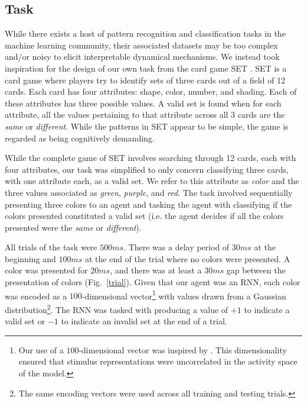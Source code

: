 \documentclass[conference]{IEEEtran}
\begin{document}
\subsection{Task}
\label{taskmethod}

While there exists a host of pattern recognition and classification tasks in the machine learning community\cite{bishop2006pattern,lecun2015deep}, their associated datasets may be too complex and/or noisy to elicit interpretable dynamical mechanisms. We instead took inspiration for the design of our own task from the card game SET \cite{gordon2017joy}. SET is a card game where players try to identify sets of three cards out of a field of 12 cards. Each card has four attributes: shape, color, number, and shading. Each of these attributes has three possible values. A valid set is found when for each attribute, all the values pertaining to that attribute across all 3 cards are the \textit{same} or \textit{different}. While the patterns in SET appear to be simple, the game is regarded as being cognitively demanding\cite{gordon2017joy}.

While the complete game of SET involves searching through 12 cards, each with four attributes, our task was simplified to only concern classifying three cards, with one attribute each, as a valid set. We refer to this attribute as \textit{color} and the three values associated as \textit{green}, \textit{purple}, and \textit{red}. The task involved sequentially presenting three colors to an agent and tasking the agent with classifying if the colors presented constituted a valid set (i.e. the agent decides if all the colors presented were the \textit{same} or \textit{different}).

All trials of the task were $500 ms$. There was a delay period of $30 ms$ at the beginning and $100 ms$ at the end of the trial where no colors were presented. A color was presented for $20 ms$, and there was at least a $30 ms$ gap between the presentation of colors (Fig.~\ref{trial}). Given that our agent was an RNN, each color was encoded as a $100$-dimensional vector\footnote{Our use of a $100$-dimensional vector was inspired by \cite{kay2022neural}. This dimensionality ensured that stimulus representations were uncorrelated in the activity space of the model.} with values drawn from a Gaussian distribution\footnote{The same encoding vectors were used across all training and testing trials.}. The RNN was tasked with producing a value of $+1$ to indicate a valid set or $-1$ to indicate an invalid set at the end of a trial.
\end{document}
